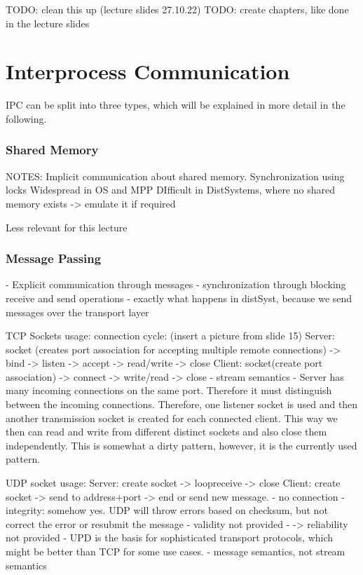 TODO: clean this up (lecture slides 27.10.22)
TODO: create chapters, like done in the lecture slides

\chapter{Interprocess Communication}

\ac{IPC} can be split into three types, which will be explained in more detail in the following.

\subsection{Shared Memory}

NOTES:
Implicit communication about shared memory.
Synchronization using locks
Widespread in OS and MPP
DIfficult in DistSystems, where no shared memory exists -> emulate it if required

Less relevant for this lecture

\subsection{Message Passing}

- Explicit communication through messages
- synchronization through blocking receive and send operations
- exactly what happens in distSyst, because we send messages over the transport layer

TCP Sockets usage:
connection cycle: (insert a picture from slide 15)
Server: socket (creates port association for accepting multiple remote connections) -> bind -> listen -> accept -> read/write -> close
Client: socket(create port association) -> connect -> write/read -> close
- stream semantics
- Server has many incoming connections on the same port. Therefore it must distinguish between the incoming connections. Therefore, one listener socket is used and then another transmission socket is created for each connected client. This way we then can read and write from different distinct sockets and also close them independently. This is somewhat a dirty pattern, however, it is the currently used pattern.

UDP socket usage:
Server: create socket -> loop{receive} -> close
Client: create socket -> send to address+port -> end or send new message.
- no connection
- integrity: somehow yes. UDP will throw errors based on checksum, but not correct the error or resubmit the message
- validity not provided
- -> reliability not provided
- UPD is the basis for sophisticated transport protocols, which might be better than TCP for some use cases.
- message semantics, not stream semantics

